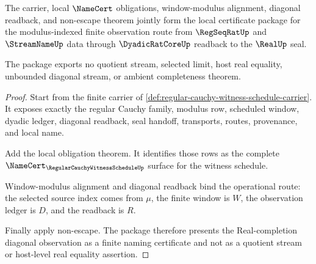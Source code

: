 \begin{theorem}
\label{thm:regular-cauchy-witness-schedule-local-certificate-package}
The carrier, local $\NameCert$ obligations, window-modulus alignment, diagonal readback, and non-escape theorem jointly form the local certificate package for the modulus-indexed finite observation route from $\RegSeqRatUp$ and $\StreamNameUp$ data through $\DyadicRatCoreUp$ readback to the $\RealUp$ seal.

The package exports no quotient stream, selected limit, host real equality, unbounded diagonal stream, or ambient completeness theorem.
\end{theorem}
\begin{proof}
Start from the finite carrier of \autoref{def:regular-cauchy-witness-schedule-carrier}. It exposes exactly the regular Cauchy family, modulus row, scheduled window, dyadic ledger, diagonal readback, seal handoff, transports, routes, provenance, and local name.

Add the local obligation theorem. It identifies those rows as the complete $\NameCert_{\RegularCauchyWitnessScheduleUp}$ surface for the witness schedule.

Window-modulus alignment and diagonal readback bind the operational route: the selected source index comes from $\mu$, the finite window is $W$, the observation ledger is $D$, and the readback is $R$.

Finally apply non-escape. The package therefore presents the Real-completion diagonal observation as a finite naming certificate and not as a quotient stream or host-level real equality assertion.
\end{proof}


